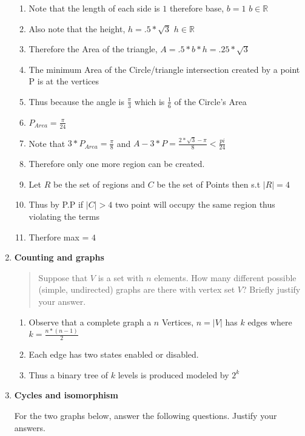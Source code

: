 \documentclass[12pt]{article}
\begin{document}
\begin{enumerate}
\begin{enumerate}
\item Note that the length of each side is $1$ therefore base, $b =1$ $b \in \mathbb{R}$
\item Also note that the height, $h = .5*\sqrt{3}$ $h \in \mathbb{R}$
\item Therefore the Area of the triangle, $A = .5*b*h = .25*\sqrt{3}$
\item The minimum Area of the Circle/triangle intersection created by a point P is at the vertices
\item Thus because the angle is $\frac{\pi}{3}$ which is $\frac{1}{6}$ of the Circle's Area
\item $P_{Area} = \frac{\pi}{24}$
\item Note that $3*P_{Area} = \frac{\pi}{8}$ and $A-3*P = \frac{2*\sqrt{3}-\pi}{8} < \frac{pi}{24}$
\item Therefore only one more region can be created.
\item Let $R$ be the set of regions and $C$ be the set of Points then s.t $|R|=4$
\item Thus by P.P if $|C| > 4$ two point will occupy the same region thus violating the terms
\item Therfore max = $4$
\end{enumerate}
\newpage
\item \textbf{Counting and graphs}

\begin{quote}
Suppose that $V$ is a set with $n$ elements.   How
many different possible (simple, undirected) 
graphs are there with vertex set $V$?  Briefly justify your answer.
\end{quote}

\begin{enumerate}
\item Observe that a complete graph a $n$ Vertices, $n =|V|$ has $k$ edges where $k = \frac{n*(n-1)}{2}$
\item Each edge has two states enabled or disabled.
\item Thus a binary tree of $k$ levels is produced modeled by $2^k$
\end{enumerate}

\item \textbf{Cycles and isomorphism}

For the two graphs below, answer the following questions.
Justify your answers.


\end{enumerate}
\end{document}
